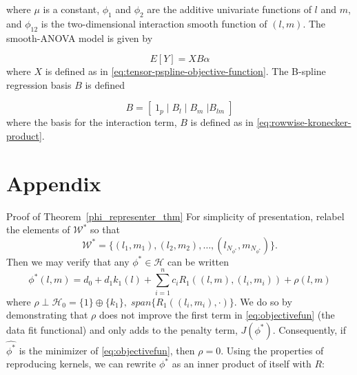 \documentclass[12pt]{article}
\theoremstyle{definition}
\begin{document}
where $\mu$ is a constant, $\phi_1$ and $\phi_2$ are the additive univariate functions of $l$ and $m$, and $\phi_{12}$ is the two-dimensional interaction smooth function of $\left(l,m\right)$. The smooth-ANOVA model is given by

\begin{equation} \label{eq:pspline-SSANOVA}
E\left[ Y \right] = X  B \alpha
\end{equation}
\noindent
where $X$ is defined as in \ref{eq:tensor-pspline-objective-function}. The B-spline regression basis $B$ is defined 

\begin{equation} \label{eq:pspline-ANOVA-basis-matrix}
B = \left[\; 1_p \; \vert \;  B_l  \; \vert \;   B_m \; \vert B_{lm} \; \right]
\end{equation}
\noindent
where the basis for the interaction term, $B$ is defined as in \ref{eq:rowwise-kronecker-product}.































\section{Appendix}


Proof of Theorem~\ref{phi_representer_thm}
 For simplicity of presentation, relabel the elements of $\mathcal{W}^*$ so that 
\[
\mathcal{W}^* = \lbrace \left( l_1,m_1 \right), \left( l_2,m_2 \right), \dots, \left( l_{N_{\phi^*}},m_{N_{\phi^*}} \right)  \rbrace.
\]
Then we may verify that any $\phi^* \in \mathcal{H}$ can be written 
\[
\phi^*\left(l,m \right) = d_0 + d_1k_1\left(l\right) + \sum_{i=1}^n  c_i R_1\left( \left(l,m\right) , \left(l_i,m_i \right)\right) + \rho\left(l,m\right)
\]
\noindent
where $\rho \perp \mathcal{H}_0 = \lbrace 1\rbrace \oplus \lbrace k_1\rbrace,\; span\lbrace R_1\left(\left(l_i, m_i \right),\cdot \right)  \rbrace$. We do so by demonstrating that  $\rho$ does not improve the first term in \eqref{eq:objectivefun} (the data fit functional) and only adds to the penalty term, $J\left(\phi^*\right)$. Consequently, if $\hat{\phi^*}$ is the minimizer of \eqref{eq:objectivefun}, then $\rho = 0$. Using the properties of reproducing kernels, we can rewrite $\phi^*$ as an inner product of itself with $R$:
 
\end{document}
